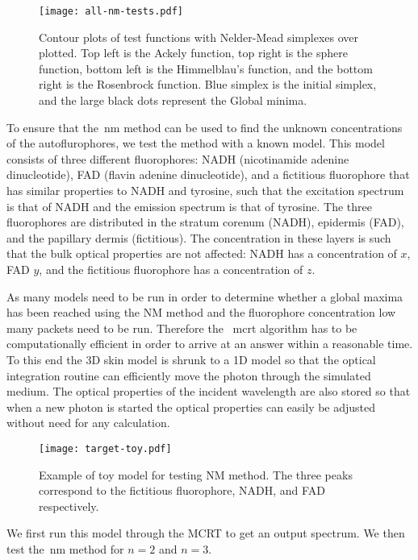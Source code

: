 \begin{figure}[!htbp]
    \centering
    \texttt{[image: all-nm-tests.pdf]}
    \caption{Contour plots of test functions with Nelder-Mead simplexes over plotted. Top left is the Ackely function, top right is the sphere function, bottom left is the Himmelblau's function, and the bottom right is the Rosenbrock function. Blue simplex is the initial simplex, and the large black dots represent the Global minima.}
    \label{fig:nmtest}
\end{figure}

To ensure that the~\gls*{nm} method can be used to find the unknown concentrations of the autoflurophores, we test the method with a known model.
This model consists of three different fluorophores: NADH (nicotinamide adenine dinucleotide), FAD (flavin adenine dinucleotide), and a fictitious fluorophore that has similar properties to NADH and tyrosine, such that the excitation spectrum is that of NADH and the emission spectrum is that of tyrosine.
The three fluorophores are distributed in the stratum corenum (NADH), epidermis (FAD), and the papillary dermis (fictitious).
The concentration in these layers is such that the bulk optical properties are not affected: NADH has a concentration of $x$, FAD $y$, and the fictitious fluorophore has a concentration of $z$.

As many models need to be run in order to determine whether a global maxima has been reached using the NM method and the fluorophore concentration low many packets need to be run.
Therefore the ~\gls*{mcrt} algorithm has to be computationally efficient in order to arrive at an answer within a reasonable time.
To this end the 3D skin model is shrunk to a 1D model so that the optical integration routine can efficiently move the photon through the simulated medium.
The optical properties of the incident wavelength are also stored so that when a new photon is started the optical properties can easily be adjusted without need for any calculation.


\begin{figure}[!htbp]
	\centering
	\texttt{[image: target-toy.pdf]}
	\caption{Example of toy model for testing NM method. The three peaks correspond to the fictitious fluorophore, NADH, and FAD respectively.}
	\label{fig:figure1}
\end{figure}

We first run this model through the MCRT to get an output spectrum.
We then test the~\gls*{nm} method for $n=2$ and $n=3$.

